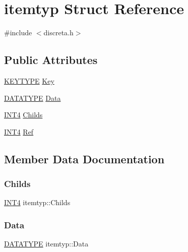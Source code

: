 \hypertarget{structitemtyp}{}\section{itemtyp Struct Reference}
\label{structitemtyp}


{\ttfamily \#include $<$discreta.\+h$>$}

\subsection*{Public Attributes}
\begin{DoxyCompactItemize}
\item 
\mbox{\hyperlink{discreta_8h_a535c8df88e5939fd8a1a3d083e75124a}{K\+E\+Y\+T\+Y\+PE}} \mbox{\hyperlink{structitemtyp_a23d7614c31c36eb13c0cef225d10ee93}{Key}}
\item 
\mbox{\hyperlink{discreta_8h_abf512b6b30146dda9c59049478bf3e99}{D\+A\+T\+A\+T\+Y\+PE}} \mbox{\hyperlink{structitemtyp_a36bcd9401714fc81042dffd8a825b253}{Data}}
\item 
\mbox{\hyperlink{galois_8h_a6675ac57b948be915e03c09228b57b05}{I\+N\+T4}} \mbox{\hyperlink{structitemtyp_a106db92a05a1821285eea86dcdbb7c04}{Childs}}
\item 
\mbox{\hyperlink{galois_8h_a6675ac57b948be915e03c09228b57b05}{I\+N\+T4}} \mbox{\hyperlink{structitemtyp_a41c0d1fa23bad826e5d72a5b85ebd323}{Ref}}
\end{DoxyCompactItemize}


\subsection{Member Data Documentation}
\mbox{\label{structitemtyp_a106db92a05a1821285eea86dcdbb7c04}} 
\subsubsection{\texorpdfstring{Childs}{Childs}}
{\footnotesize\ttfamily \mbox{\hyperlink{galois_8h_a6675ac57b948be915e03c09228b57b05}{I\+N\+T4}} itemtyp\+::\+Childs}

\mbox{\label{structitemtyp_a36bcd9401714fc81042dffd8a825b253}} 
\subsubsection{\texorpdfstring{Data}{Data}}
{\footnotesize\ttfamily \mbox{\hyperlink{discreta_8h_abf512b6b30146dda9c59049478bf3e99}{D\+A\+T\+A\+T\+Y\+PE}} itemtyp\+::\+Data}

